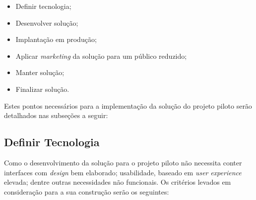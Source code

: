 \begin{itemize}
    \item Definir tecnologia;
    \item Desenvolver solução;
    \item Implantação em produção;
    \item Aplicar \textit{marketing} da solução para um público reduzido;
    \item Manter solução;
    \item Finalizar solução.
\end{itemize}

Estes pontos necessários para a implementação da solução do projeto piloto serão detalhados 
nas subseções a seguir:

\subsection{Definir Tecnologia}
\label{sub:definir_tecnologia}
Como o desenvolvimento da solução para o projeto piloto não necessita conter interfaces com \textit{design} bem elaborado;
usabilidade, baseado em \textit{user} \textit{experience} elevada; dentre outras necessidades não funcionais. Os critérios levados em
consideração para a sua construção serão os seguintes:


